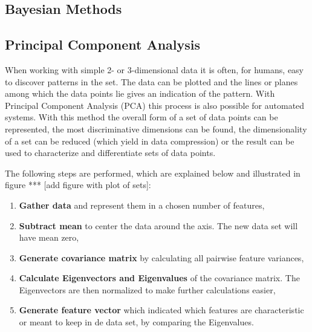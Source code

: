 \subsection{Bayesian Methods}

\subsection{Principal Component Analysis}
When working with simple 2- or 3-dimensional data it is often, for humans, easy to discover patterns in the set.
The data can be plotted and the lines or planes among which the data points lie gives an indication of the pattern.
With Principal Component Analysis (PCA) this process is also possible for automated systems.
With this method the overall form of a set of data points can be represented, the most discriminative dimensions can be found, the dimensionality of a set can be reduced (which yield in data compression) or the result can be used to characterize and differentiate sets of data points.

The following steps are performed, which are explained below and illustrated in figure *** [add figure with plot of sets]:

\begin{enumerate}
	\item \textbf{Gather data} and represent them in a chosen number of features,
	\item \textbf{Subtract mean} to center the data around the axis. The new data set will have mean zero,
	\item \textbf{Generate covariance matrix} by calculating all pairwise feature variances,
	\item \textbf{Calculate Eigenvectors and Eigenvalues} of the covariance matrix.
	The Eigenvectors are then normalized to make further calculations easier,
	\item \textbf{Generate feature vector} which indicated which features are characteristic or meant to keep in de data set, by comparing the Eigenvalues.
\end{enumerate}

